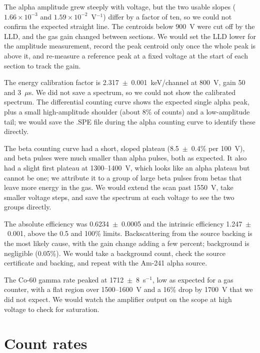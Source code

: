\documentclass[12pt]{article}
\begin{document}
The alpha amplitude grew steeply with voltage, but the two usable slopes ($1.66\times10^{-3}$ and $1.59\times10^{-2}$~V$^{-1}$) differ by a factor of ten, so we could not confirm the expected straight line. The centroids below 900~V were cut off by the LLD, and the gas gain changed between sections. We would set the LLD lower for the amplitude measurement, record the peak centroid only once the whole peak is above it, and re-measure a reference peak at a fixed voltage at the start of each section to track the gain.

The energy calibration factor is 2.317~$\pm$~0.001~keV/channel at 800~V, gain 50 and 3~$\mu$s. We did not save a spectrum, so we could not show the calibrated spectrum. The differential counting curve shows the expected single alpha peak, plus a small high-amplitude shoulder (about 8\% of counts) and a low-amplitude tail; we would save the .SPE file during the alpha counting curve to identify these directly.

The beta counting curve had a short, sloped plateau (8.5~$\pm$~0.4\% per 100~V), and beta pulses were much smaller than alpha pulses, both as expected. It also had a slight first plateau at 1300--1400~V, which looks like an alpha plateau but cannot be one; we attribute it to a group of large beta pulses from betas that leave more energy in the gas. We would extend the scan past 1550~V, take smaller voltage steps, and save the spectrum at each voltage to see the two groups directly.

The absolute efficiency was 0.6234~$\pm$~0.0005 and the intrinsic efficiency 1.247~$\pm$~0.001, above the 0.5 and 100\% limits. Backscattering from the source backing is the most likely cause, with the gain change adding a few percent; background is negligible (0.05\%). We would take a background count, check the source certificate and backing, and repeat with the Am-241 alpha source.

The Co-60 gamma rate peaked at 1712~$\pm$~8~s$^{-1}$, low as expected for a gas counter, with a flat region over 1500--1600~V and a 16\% drop by 1700~V that we did not expect. We would watch the amplifier output on the scope at high voltage to check for saturation.



\appendix
\section{Count rates}
\label{app:rates}
\end{document}
